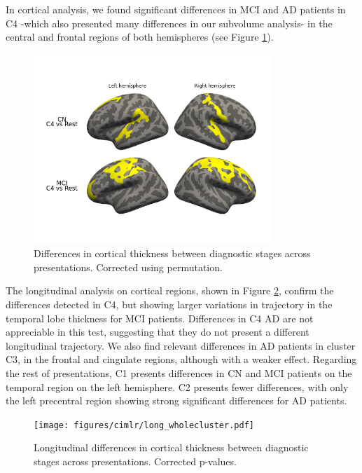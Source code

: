 In cortical analysis, we found significant differences in MCI and AD patients in C4 -which also presented many differences in our subvolume analysis- in the central and frontal regions of both hemispheres (see Figure \ref{dxcluster_againstrest_cort}). \\

\begin{figure}[!htbp]
\centering
\includegraphics[width=0.8\textwidth]{figures/cimlr/ex4_cort.png}
\caption[Diagnostic interaction analysis, cortical thickness.]{Differences in cortical thickness between diagnostic stages across presentations. Corrected using permutation.}
\label{dxcluster_againstrest_cort}
\end{figure}

The longitudinal analysis on cortical regions, shown in Figure \ref{long_diagnostic_interaction}, confirm the differences detected in C4, but showing larger variations in trajectory in the temporal lobe thickness for MCI patients. Differences in C4 AD are not appreciable in this test, suggesting that they do not present a different longitudinal trajectory. We also find relevant differences in AD patients in cluster C3, in the frontal and cingulate regions, although with a weaker effect. Regarding the rest of presentations, C1 presents differences in CN and MCI patients on the temporal region on the left hemisphere. C2 presents fewer differences, with only the left precentral region showing strong significant differences for AD patients.

\begin{figure}[!htbp]
\centering
\texttt{[image: figures/cimlr/long\_wholecluster.pdf]}
\caption[Longitudinal diagnostic interaction analysis, cortical thickness.]{Longitudinal differences in cortical thickness between diagnostic stages across presentations. Corrected p-values.}
\label{long_diagnostic_interaction}
\end{figure}

